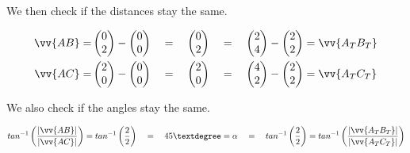 \documentclass{article}
\begin{document}
  We then check if the distances stay the same.

  \begin{align*}
    \vv{AB} =&
    \begin{pmatrix}
      0 \\ 
      2
    \end{pmatrix}
    -
    \begin{pmatrix}
      0 \\ 
      0
    \end{pmatrix}
    \quad
    =
    \quad
    \begin{pmatrix}
      0 \\ 
      2
    \end{pmatrix}
    \quad
    =
    \quad
    \begin{pmatrix}
      2 \\ 
      4
    \end{pmatrix}
    -
    \begin{pmatrix}
      2 \\ 
      2
    \end{pmatrix}
    =
    \vv{A_TB_T}
    \\
    \vv{AC} =&
    \begin{pmatrix}
      2 \\ 
      0
    \end{pmatrix}
    -
    \begin{pmatrix}
      0 \\ 
      0
    \end{pmatrix}
    \quad
    =
    \quad
    \begin{pmatrix}
      2 \\ 
      0
    \end{pmatrix}
    \quad
    =
    \quad
    \begin{pmatrix}
      4 \\ 
      2
    \end{pmatrix}
    -
    \begin{pmatrix}
      2 \\ 
      2
    \end{pmatrix}
    =
    \vv{A_TC_T}
  \end{align*}

  We also check if the angles stay the same.

  \begin{align*}
    tan^{-1}\left(\frac{\lvert\vv{AB}\rvert}{\lvert\vv{AC}\rvert}\right)
    =
    tan^{-1}\left(\frac{2}{2}\right)
    \quad
    =
    \quad
    45°
    =
    \alpha
    \quad
    =
    \quad
    tan^{-1}\left(\frac{2}{2}\right)
    =
    tan^{-1}\left(\frac{\lvert\vv{A_TB_T}\rvert}{\lvert\vv{A_TC_T}\rvert}\right)
  \end{align*}
\end{document}
